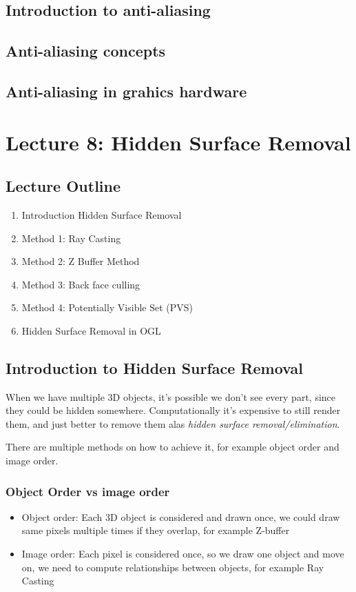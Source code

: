 \documentclass[11pt]{article}
\begin{document}

\subsection{Introduction to anti-aliasing}
\subsection{Anti-aliasing concepts}
\subsection{Anti-aliasing in grahics hardware}


\section{Lecture 8: Hidden Surface Removal}
\subsection*{Lecture Outline}
\begin{enumerate}
    \item Introduction Hidden Surface Removal
    \item Method 1: Ray Casting
    \item Method 2: Z Buffer Method
    \item Method 3: Back face culling
    \item Method 4: Potentially Visible Set (PVS)
    \item Hidden Surface Removal in OGL
\end{enumerate}


\subsection{Introduction to Hidden Surface Removal}
When we have multiple 3D objects, it's possible we don't see every part, since they could be hidden somewhere. Computationally it's expensive to still render them, and just better to remove them alas \textit{hidden surface removal/elimination}.

There are multiple methods on how to achieve it, for example object order and image order.
\subsubsection*{Object Order vs image order}
\begin{itemize}
    \item Object order: Each 3D object is considered and drawn once, we could draw same pixels multiple times if they overlap, for example Z-buffer
    \item Image order: Each pixel is considered once, so we draw one object and move on, we need to compute relationships between objects, for example Ray Casting
\end{itemize}
\end{document}

